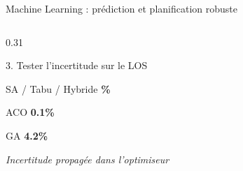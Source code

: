 \documentclass[aspectratio=169,11pt]{beamer}
\begin{document}
\begin{frame}{Machine Learning : prédiction et planification robuste}
\begin{columns}[T,onlytextwidth]
\begin{column}{0.31\textwidth}
\begin{block}{3. Tester l'incertitude sur le LOS}
\vspace{0.15cm}

SA / Tabu / Hybride
\hfill
{\color{mcmPrimary}\textbf{\%}}

\vspace{0.10cm}

ACO
\hfill
{\color{mcmPrimary}\textbf{0.1\%}}

\vspace{0.10cm}

GA
\hfill
{\color{mcmPrimary}\textbf{4.2\%}}

\vspace{0.30cm}

\textit{Incertitude propagée dans l'optimiseur}

\end{block}

\end{column}

\end{columns}
\end{frame}
\end{document}
